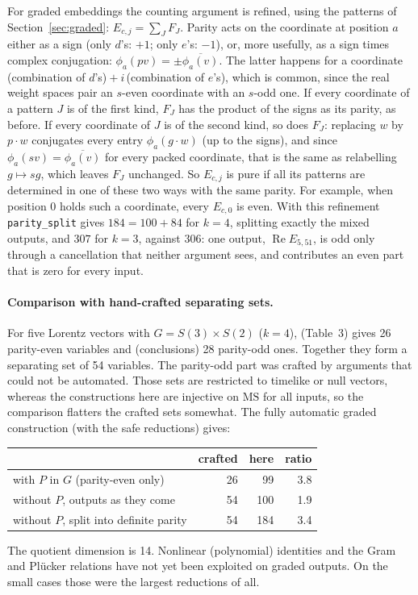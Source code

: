 \documentclass[11pt]{article}
\theoremstyle{definition}
\theoremstyle{remark}
\newcommand{\MS}{\mathrm{MS}}
\begin{document}
For graded embeddings the counting argument is refined, using the patterns of
Section~\ref{sec:graded}: $E_{c,j} = \sum_J F_J$. Parity acts on the
coordinate at position $a$ either as a sign (only $d$'s: $+1$; only $e$'s:
$-1$), or, more usefully, as a sign times complex conjugation:
$\phi_a(p v) = \pm\overline{\phi_a(v)}$. The latter happens for a coordinate
(combination of $d$'s)${}+i\,$(combination of $e$'s), which is common, since the
real weight spaces pair an $s$-even coordinate with an $s$-odd one. If every
coordinate of a pattern $J$ is of the first kind, $F_J$ has the product of the
signs as its parity, as before. If every coordinate of $J$ is of the second
kind, so does $F_J$: replacing $w$ by $p\cdot w$ conjugates every entry
$\phi_a(g\cdot w)$ (up to the signs), and since $\phi_a(s v) =
\overline{\phi_a(v)}$ for every packed coordinate, that is the same as relabelling
$g \mapsto sg$, which leaves $F_J$ unchanged. So $E_{c,j}$ is pure if all its
patterns are determined in one of these two ways with the same parity. For
example, when position 0 holds such a coordinate, every $E_{c,0}$ is even.
With this refinement \texttt{parity\_split} gives $184 = 100 + 84$ for $k = 4$,
splitting exactly the mixed outputs, and $307$ for $k = 3$, against $306$:
one output, $\operatorname{Re} E_{5,51}$, is odd only through a cancellation
that neither argument sees, and contributes an even part that is zero for every
input.

\paragraph{Comparison with hand-crafted separating sets.}
For five Lorentz vectors with $G = S(3) \times S(2)$ ($k = 4$),
\cite{GHL20} (Table~3) gives 26 parity-even variables and \cite{LHG22}
(conclusions) 28 parity-odd ones. Together they form a separating set of 54
variables. The parity-odd part was crafted by arguments that could not be
automated. Those sets are restricted to timelike or null vectors, whereas the
constructions here are injective on $\MS$ for all inputs, so the comparison
flatters the crafted sets somewhat. The fully automatic graded construction
(with the safe reductions) gives:
\begin{center}
\begin{tabular}{lrrr}
  & crafted & here & ratio \\ \hline
  with $P$ in $G$ (parity-even only)           & 26 & 99  & 3.8 \\
  without $P$, outputs as they come             & 54 & 100 & 1.9 \\
  without $P$, split into definite parity       & 54 & 184 & 3.4
\end{tabular}
\end{center}
The quotient dimension is 14. Nonlinear (polynomial) identities and the Gram
and Pl\"ucker relations have not yet been exploited on graded outputs. On the
small cases those were the largest reductions of all.
\end{document}
